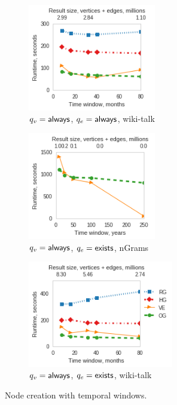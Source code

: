 \begin{figure}[t!]
\centering
\begin{subfigure}{0.3\textwidth}
\includegraphics[width=2.2in]{figs/agg_allall_wikitalk_build13.png}
\caption{$q_v=\textsf{always}$, $q_e=\textsf{always}$, wiki-talk}
\label{fig:agg1}
\end{subfigure}
\begin{subfigure}{0.3\textwidth}
\includegraphics[width=2.2in]{figs/agg_allexists_ngrams_build13.png}
\caption{$q_v=\textsf{always}$, $q_e=\textsf{exists}$, nGrams}
\label{fig:agg2}
\end{subfigure}
\begin{subfigure}{0.36\textwidth}
\includegraphics[width=2.5in]{figs/agg_allexists_wikitalk_build13.png}
\caption{$q_v=\textsf{always}$, $q_e=\textsf{exists}$, wiki-talk}
\label{fig:agg4}
\end{subfigure}
\vspace{-0.1in}
\caption[]{Node creation with temporal windows.}
\vspace{-0.1in}
\label{fig:agg}
\end{figure}

